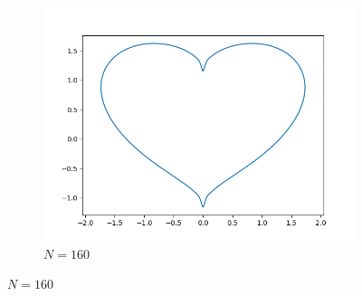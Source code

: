 \documentclass[a4paper]{article}
\begin{document}
\begin{figure}[H]
\begin{subfigure}[b]{0.35\textwidth}
        \centering
        \includegraphics[width=\textwidth]{../figure/E_heart_cum_PP160.png}
        \caption{$N = 160$}
    \end{subfigure}
\end{figure}
\end{document}
